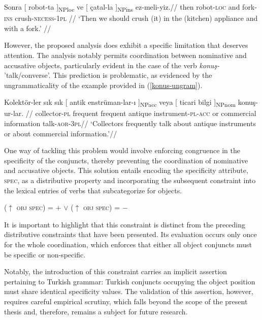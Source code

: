 \pex[glspace=!1em,everygla={},everyglb={},aboveglbskip=-.15ex, interpartskip=15pt]
\label{unlikecase-example} 
\begingl
\gla Sonra {[} {robot-ta ]\textsubscript{NPloc}} ve {[} {çatal-la ]\textsubscript{NPins}} ez-meli-yiz.//
\glb then robot-\textsc{loc} and fork-\textsc{ins} crush-\textsc{necess}-\textsc{1pl} //
\glft `Then we should crush (it) in the (kitchen) appliance and with a fork.'
//
\endgl
\xe

However, the proposed analysis does exhibit a specific limitation that deserves attention. The analysis notably permits coordination between nominative and accusative objects, particularly evident in the case of the verb \textit{konuş-} 'talk/converse'. This prediction is problematic, as evidenced by the ungrammaticality of the example provided in (\ref{konus-ungram}).

\pex[glspace=!1em,everygla={},everyglb={},aboveglbskip=-.15ex, interpartskip=15pt]
\label{konus-ungram} 
\begingl
\gla\ljudge{*}Kolektör-ler sık sık {[} antik {enstrüman-lar-ı ]\textsubscript{NPacc}} veya {[} ticari {bilgi ]\textsubscript{NPnom}} konuş-ur-lar. //
\glb collector-\textsc{pl}  frequent frequent antique instrument-\textsc{pl}-\textsc{acc} or commercial information talk-\textsc{aor}-\textsc{3pl}//
\glft `Collectors frequently talk about antique instruments or about commercial information.'//
\endgl
\xe

One way of tackling this problem would involve enforcing congruence in the specificity of the conjuncts, thereby preventing the coordination of nominative and accusative objects. This solution entails encoding the specificity attribute, \textsc{spec}, as a distributive property and incorporating the subsequent constraint into the lexical entries of verbs that subcategorize for objects.

\pex
($\uparrow$ \textsc{obj spec}) = $+$ $\lor$ ($\uparrow$ \textsc{obj spec}) = $-$ 
\xe

It is important to highlight that this constraint is distinct from the preceding distributive constraints that have been presented. Its evaluation occurs only once for the whole coordination, which enforces that either all object conjuncts must be specific or non-specific.

Notably, the introduction of this constraint carries an implicit assertion pertaining to Turkish grammar: Turkish conjuncts occupying the object position must share identical specificity values. The validation of this assertion, however, requires careful empirical scrutiny, which falls beyond the scope of the present thesis and, therefore, remains a subject for future research.

